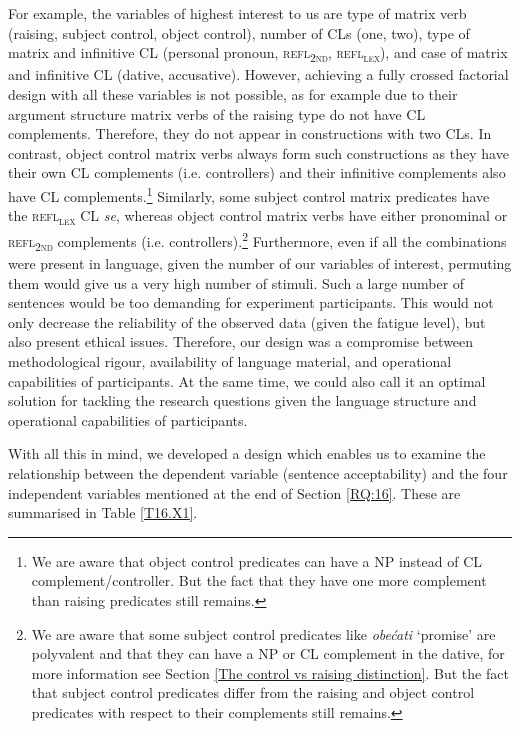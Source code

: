 For example, the variables of highest interest to us are type of matrix verb (raising, subject control, object control), number of CLs (one, two), type of matrix and infinitive CL (personal pronoun, \textsc{refl\textsubscript{2nd}}, \textsc{refl\textsubscript{\textsc{lex}}}), and case of matrix and infinitive CL (dative, accusative). However, achieving a fully crossed factorial design with all these variables is not possible, as for example due to their argument structure matrix verbs of the raising type do not have CL complements. Therefore, they do not appear in constructions with two CLs. In contrast, object control matrix verbs always form such constructions as they have their own CL complements (i.e. controllers) and their infinitive complements also have CL complements.\footnote{We are aware that object control predicates can have a NP instead of CL complement/controller. But the fact that they have one more complement than raising predicates still remains. } Similarly, some subject control matrix predicates have the \textsc{refl\textsubscript{\textsc{lex}}} CL \textit{se}, whereas object control matrix verbs have either pronominal or \textsc{refl\textsubscript{2nd}} complements (i.e. controllers).\footnote{We are aware that some subject control predicates like \textit{obećati} ‘promise’ are polyvalent and that they can have a NP or CL complement in the dative, for more information see Section \ref{The control vs raising distinction}. But the fact that subject control predicates differ from the raising and object control predicates with respect to their complements still remains.} Furthermore, even if all the combinations were present in language, given the number of our variables of interest, permuting them would give us a very high number of stimuli. Such a large number of sentences would be too demanding for experiment participants. This would not only decrease the reliability of the observed data (given the fatigue level), but also present ethical issues. Therefore, our design was a compromise between methodological rigour, availability of language material, and operational capabilities of participants. At the same time, we could also call it an optimal solution for tackling the research questions given the language structure and operational capabilities of participants.

With all this in mind, we developed a design which enables us to examine the relationship between the dependent variable (sentence acceptability) and the four independent variables mentioned at the end of Section \ref{RQ:16}. These are summarised in Table \ref{T16.X1}.

